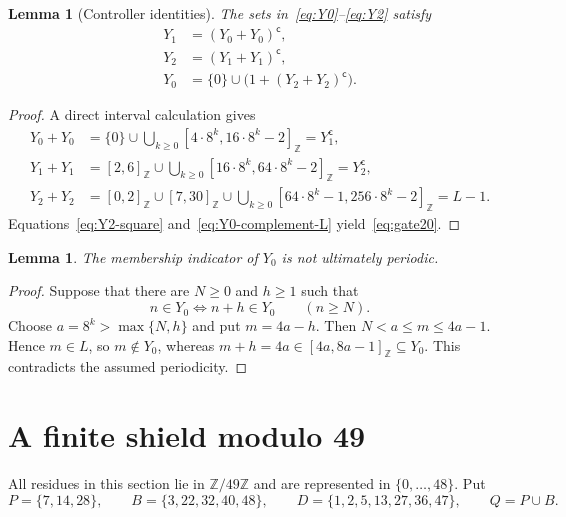 \documentclass[11pt,letterpaper]{article}
\newtheorem{lemma}[theorem]{Lemma}
\newcommand{\Zfortynine}{\mathbb{Z}/49\mathbb{Z}}
\newcommand{\cpl}[1]{#1^{\mathsf{c}}}
\newcommand{\ints}[2]{[#1,#2]_{\mathbb{Z}}}
\begin{document}
\begin{lemma}[Controller identities]
The sets in~\eqref{eq:Y0}--\eqref{eq:Y2} satisfy
\begin{align}
Y_1&=\cpl{(Y_0+Y_0)},                                      \label{eq:gate01}\\
Y_2&=\cpl{(Y_1+Y_1)},                                      \label{eq:gate12}\\
Y_0&=\{0\}\cup\bigl(1+\cpl{(Y_2+Y_2)}\bigr).             \label{eq:gate20}
\end{align}
\end{lemma}

\begin{proof}
A direct interval calculation gives
\begin{align}
Y_0+Y_0
&=\{0\}\cup\bigcup_{k\geq0}
  \ints{4\cdot8^k}{16\cdot8^k-2}=\cpl{Y_1},
  \label{eq:Y0-square}\\
Y_1+Y_1
&=\ints{2}{6}\cup\bigcup_{k\geq0}
  \ints{16\cdot8^k}{64\cdot8^k-2}=\cpl{Y_2},
  \label{eq:Y1-square}\\
Y_2+Y_2
&=\ints{0}{2}\cup\ints{7}{30}\cup\bigcup_{k\geq0}
  \ints{64\cdot8^k-1}{256\cdot8^k-2}=L-1.
  \label{eq:Y2-square}
\end{align}
Equations~\eqref{eq:Y2-square} and~\eqref{eq:Y0-complement-L} yield~\eqref{eq:gate20}.
\end{proof}

\begin{lemma}\label{lem:Y0-aperiodic}
The membership indicator of \(Y_0\) is not ultimately periodic.
\end{lemma}

\begin{proof}
Suppose that there are \(N\geq0\) and \(h\geq1\) such that
\[
n\in Y_0\iff n+h\in Y_0
\qquad(n\geq N).
\]
Choose \(a=8^k>\max\{N,h\}\) and put \(m=4a-h\). Then \(N<a\leq m\leq4a-1\). Hence \(m\in L\), so \(m\notin Y_0\), whereas \(m+h=4a\in\ints{4a}{8a-1}\subseteq Y_0\). This contradicts the assumed periodicity.
\end{proof}

\section{A finite shield modulo 49}

All residues in this section lie in \(\Zfortynine\) and are represented in \(\{0,\ldots,48\}\). Put
\begin{equation}
P=\{7,14,28\},\qquad B=\{3,22,32,40,48\},\qquad
D=\{1,2,5,13,27,36,47\},\qquad Q=P\cup B.
\end{equation}
\end{document}
